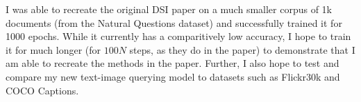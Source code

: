 \documentclass{article}
\begin{document}
I was able to recreate the original DSI paper on a much smaller corpus of 1k documents (from the Natural Questions dataset) and successfully trained it for 1000 epochs. While it currently has a comparitively low accuracy, I hope to train it for much longer (for $100N$ steps, as they do in the paper) to demonstrate that I am able to recreate the methods in the paper. Further, I also hope to test and compare my new text-image querying model to datasets such as Flickr30k and COCO Captions.

\end{document}
